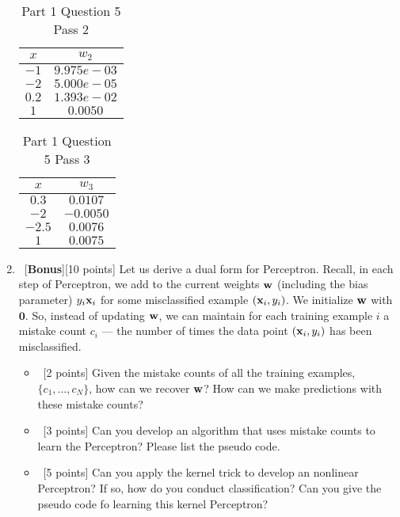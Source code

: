\documentclass[12pt, fullpage,letterpaper]{article}
\begin{document}
\begin{enumerate}
	\begin{table}[h]
		\centering
		\begin{tabular}{c|c}
			$x$ & $w_2$ \\ 
			\hline\hline
			$-1$  & $9.975e-03$ \\ \hline
			$-2$  & $5.000e-05$ \\ \hline
			$0.2$ & $1.393e-02$ \\ \hline
			$1$   & $0.0050$    \\ \hline
		\end{tabular}
	\caption{Part 1 Question 5 Pass 2}
	\end{table}
	
	\begin{table}[h]
		\centering
		\begin{tabular}{c|c}
			$x$ & $w_3$ \\ 
			\hline\hline
			$0.3$  & $0.0107$  \\ \hline
			$-2$   & $-0.0050$ \\ \hline
			$-2.5$ & $0.0076$  \\ \hline
			$1$    & $0.0075$  \\ \hline
		\end{tabular}
	\caption{Part 1 Question 5 Pass 3}
	\end{table}

	\item~[\textbf{Bonus}][10 points] Let us derive a dual form for Perceptron. Recall, in each step of Perceptron, we add to the current weights ${\bf w}$ (including the bias parameter) $y_i{\bf x}_i$ for some misclassified example $({\bf x}_i, y_i)$. We initialize ${\bf w}$ with $\mathbf{0}$. So, instead of updating ${\bf w}$, we can maintain for each training example $i$ a mistake count $c_i$ --- the number of times the data point $({\bf x}_i, y_i)$ has been misclassified. 
	
	\begin{itemize}
		\item~[2 points] Given the mistake counts of all the training examples, $\{c_1, \ldots, c_N\}$, how can we recover ${\bf w}$? How can we make predictions with these mistake counts? 
		\item~[3 points] Can you develop an algorithm that uses mistake counts to learn the Perceptron? Please list the pseudo code. 
		\item~[5 points] Can you apply the kernel trick to develop an nonlinear Perceptron? If so, how do you conduct classification? Can you give the pseudo code fo learning this kernel Perceptron? 
	\end{itemize}   
	
\end{enumerate}
\end{document}
